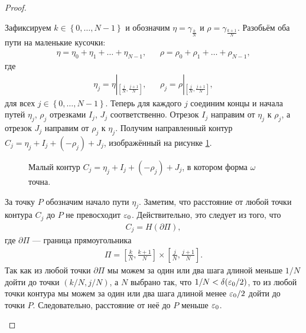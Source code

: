 \documentclass[../complex-analysis.tex]{subfiles}
\begin{document}
\begin{proof}
\begin{itemize}
   Зафиксируем $k \in \left\{ 0, \ldots, N-1 \right\}$ и обозначим $\eta = \gamma_{\frac{k}{N}}$  и $\rho = \gamma_{\frac{k+1}{N}}$. Разобьём оба пути на маленькие кусочки:
   \begin{align*}
    \eta = \eta_0 + \eta_1 + \ldots + \eta_{N-1}, & &\rho = \rho_0 + \rho_1 + \ldots + \rho_{N-1},
   \end{align*} где
   \begin{align*}
 \eta_j = \eta \left\rvert_{\left[\frac{j}{N},\frac{j+1}{N}\right]}\right., & &\rho_j = \rho\left\rvert_{\left[\frac{j}{N},\frac{j+1}{N}\right]}\right.,
   \end{align*} для всех $j \in \left\{ 0, \ldots, N - 1 \right\}$. Теперь для каждого $j$ соединим концы и начала путей $\eta_j$, $\rho_j$ отрезками $I_j$, $J_j$ соответственно. Отрезок $I_j$ направим от $\eta_j$ к $\rho_j$, а отрезок $J_j$ направим от $\rho_j$ к $\eta_j$. Получим направленный контур $C_j = \eta_j + I_j + (-\rho_j) + J_j$, изображённый на рисунке \ref{fig:closed_1_form_small_contur}.

   \begin{figure}[ht]
    \centering
    \caption{Малый контур $C_j = \eta_j + I_j + (-\rho_j) + J_j$, в котором форма $\omega$ точна.}
    \label{fig:closed_1_form_small_contur}
   \end{figure}

   За точку $P$ обозначим начало пути $\eta_j$. Заметим, что расстояние от любой точки контура $C_j$ до $P$ не превосходит $\varepsilon_0$. Действительно, это следует из того, что
   \begin{align*}
    C_j = H(\partial \Pi),
   \end{align*} где $\partial \Pi$ --- граница прямоугольника
   \begin{align*}
    \Pi = \left[ \frac{k}{N}, \frac{k+1}{N} \right] \times \left[ \frac{j}{N}, \frac{j+1}{N} \right].
   \end{align*} Так как из любой точки $\partial \Pi$ мы можем за один или два шага длиной меньше $1 / N$ дойти до точки $(k / N, j / N)$, а $N$ выбрано так, что $1 / N < \delta(\varepsilon_0 / 2)$, то из любой точки контура мы можем за один или два шага длиной менее $\varepsilon_0 / 2$ дойти до точки $P$. Следовательно, расстояние от неё до $P$ меньше $\varepsilon_0$.


\end{itemize}
\end{proof}
\end{document}
